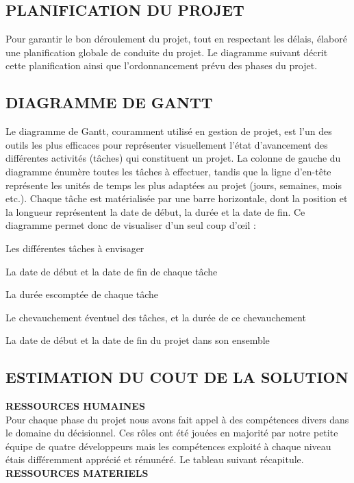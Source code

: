  \subsection{PLANIFICATION DU PROJET}
 
 Pour garantir le bon déroulement du projet, tout en respectant les délais, élaboré une planification globale de conduite du projet. Le diagramme suivant décrit cette planification ainsi que l’ordonnancement prévu des phases du projet. 
 \subsection{DIAGRAMME DE GANTT }
 
  Le diagramme de Gantt, couramment utilisé en gestion de projet, est l’un des outils les plus efficaces pour représenter visuellement l’état d’avancement des différentes activités (tâches) qui constituent un projet. La colonne de gauche du diagramme énumère toutes les tâches à effectuer, tandis que la ligne d’en-tête représente les unités de temps les plus adaptées au projet (jours, semaines, mois etc.). Chaque tâche est matérialisée par une barre horizontale, dont la position et la longueur représentent la date de début, la durée et la date de fin. Ce diagramme permet donc de visualiser d’un seul coup d’œil :
  \begin{list}{•}{ }
   \item Les différentes tâches à envisager
   \item La date de début et la date de fin de chaque tâche
   \item La durée escomptée de chaque tâche
   \item Le chevauchement éventuel des tâches, et la durée de ce chevauchement
   \item La date de début et la date de fin du projet dans son ensemble\\
  \end{list}


  
  \subsection{ESTIMATION DU COUT DE LA SOLUTION}
  
  \textbf{RESSOURCES HUMAINES}\\
 	Pour chaque phase du projet nous avons fait appel à des compétences divers dans le domaine du décisionnel. Ces rôles ont été jouées en majorité par notre petite équipe de quatre développeurs mais les compétences exploité à chaque niveau étais différemment apprécié et rémunéré. Le tableau suivant récapitule.\\

  \textbf{RESSOURCES MATERIELS}\\

